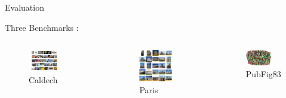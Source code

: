 \documentclass{beamer}
\begin{document}
  \begin{frame}{Evaluation}

    \begin{center}
      Three Benchmarks :
    \end{center}
    \begin{columns}[c]
      \begin{figure}
        \includegraphics[width=0.6\textwidth]{images/slides/caldech256.jpg}
        \caption{Caldech}
      \end{figure}
      \begin{figure}
        \includegraphics[width=0.7\textwidth]{images/slides/paris.jpg}
        \caption{Paris}
      \end{figure}
      \begin{figure}
        \includegraphics[width=0.7\textwidth]{images/slides/public.jpg}
        \caption{PubFig83}
      \end{figure}
    \end{columns}
\end{frame}
\end{document}
